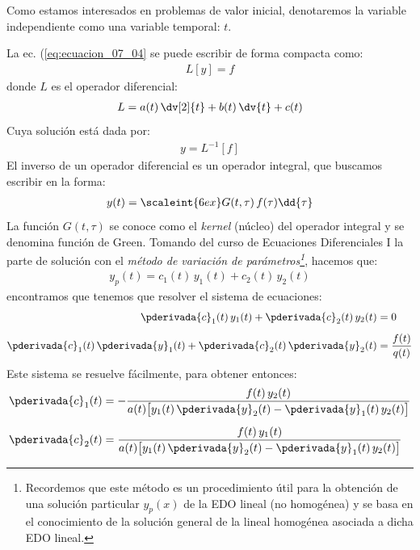 Como estamos interesados en problemas de valor inicial, denotaremos la variable independiente como una variable temporal: $t$.
\par
La ec. (\ref{eq:ecuacion_07_04} se puede escribir de forma compacta como:
\begin{align*}
L [y] = f
\end{align*}
donde $L$ es el operador diferencial:
\begin{align*}
L = a (t) \, \dv[2]{t} + b (t) \, \dv{t} + c (t) 
\end{align*}
Cuya solución está dada por:
\begin{align*}
y = L^{-1} [f]
\end{align*}
El inverso de un operador diferencial es un operador integral, que buscamos escribir en la forma:
\begin{align*}
y (t) = \scaleint{6ex} G (t, \tau) \, f(\tau) \dd{\tau}
\end{align*}
La función $G (t, \tau)$ se conoce como el  \emph{kernel} (núcleo) del operador integral y  se denomina función de Green.
\newpage
Tomando del curso de Ecuaciones Diferenciales I la parte de solución con el \emph{método de variación de parámetros\footnote{Recordemos que este método es un procedimiento útil para la obtención de una solución particular
$y_{p} (x)$ de la EDO lineal (no homogénea) y se basa en el conocimiento de la solución general de la lineal homogénea asociada a dicha EDO lineal.}}, hacemos que:
\begin{align}
y_{p} (t) = c_{1} (t) \, y_{1} (t) + c_{2} (t) \, y_{2} (t)
\label{eq:ecuacion_07_05}
\end{align}
encontramos que tenemos que resolver el sistema de ecuaciones:
\begin{align}
\begin{aligned}[b]
\pderivada{c}_{1} (t) \, y_{1} (t) + \pderivada{c}_{2} (t) \, y_{2} (t) &= 0 \\[0.5em]
\pderivada{c}_{1} (t) \, \pderivada{y}_{1} (t) + \pderivada{c}_{2} (t) \, \pderivada{y}_{2} (t) &= \dfrac{f (t)}{q (t)}
\end{aligned}
\label{eq:ecuacion_07_06}
\end{align}
Este sistema se resuelve fácilmente, para obtener entonces:
\begin{align}
\begin{aligned}[b]
\pderivada{c}_{1} (t) &= - \dfrac{f (t) \, y_{2} (t)}{a (t) \big[ y_{1} (t) \, \pderivada{y}_{2} (t)  - \pderivada{y}_{1} (t) \, y_{2} (t) \big]} \\[0.5em]
\pderivada{c}_{2} (t) &= \dfrac{f (t) \, y_{1} (t)}{a (t) \big[ y_{1} (t) \, \pderivada{y}_{2} (t)  - \pderivada{y}_{1} (t) \, y_{2} (t) \big]}
\end{aligned}
\label{eq:ecuacion_07_07}
\end{align}
